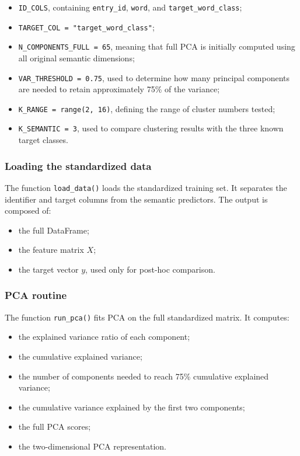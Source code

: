 \documentclass{ipgpmaster}
\begin{document}
\begin{itemize}
    \item \texttt{ID\_COLS}, containing \texttt{entry\_id}, \texttt{word}, and \texttt{target\_word\_class};
    \item \texttt{TARGET\_COL = "target\_word\_class"};
    \item \texttt{N\_COMPONENTS\_FULL = 65}, meaning that full PCA is initially computed using all original semantic dimensions;
    \item \texttt{VAR\_THRESHOLD = 0.75}, used to determine how many principal components are needed to retain approximately 75\% of the variance;
    \item \texttt{K\_RANGE = range(2, 16)}, defining the range of cluster numbers tested;
    \item \texttt{K\_SEMANTIC = 3}, used to compare clustering results with the three known target classes.
\end{itemize}

\subsubsection{Loading the standardized data}

The function \texttt{load\_data()} loads the standardized training set. It separates the identifier and target columns from the semantic predictors. The output is composed of:

\begin{itemize}
    \item the full DataFrame;
    \item the feature matrix \(X\);
    \item the target vector \(y\), used only for post-hoc comparison.
\end{itemize}

\subsubsection{PCA routine}

The function \texttt{run\_pca()} fits PCA on the full standardized matrix. It computes:

\begin{itemize}
    \item the explained variance ratio of each component;
    \item the cumulative explained variance;
    \item the number of components needed to reach 75\% cumulative explained variance;
    \item the cumulative variance explained by the first two components;
    \item the full PCA scores;
    \item the two-dimensional PCA representation.
\end{itemize}
\end{document}
